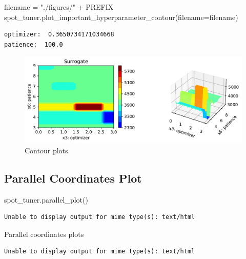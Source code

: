 \documentclass[
  letterpaper,
  DIV=11,
  numbers=noendperiod]{scrreprt}
\newenvironment{Shaded}{\begin{snugshade}}{\end{snugshade}}
\newcommand{\NormalTok}[1]{\textcolor[rgb]{0.00,0.23,0.31}{#1}}
\newcommand{\OperatorTok}[1]{\textcolor[rgb]{0.37,0.37,0.37}{#1}}
\newcommand{\StringTok}[1]{\textcolor[rgb]{0.13,0.47,0.30}{#1}}
\begin{document}
\begin{Shaded}
\begin{Highlighting}[]
\NormalTok{filename }\OperatorTok{=} \StringTok{"./figures/"} \OperatorTok{+}\NormalTok{ PREFIX}
\NormalTok{spot\_tuner.plot\_important\_hyperparameter\_contour(filename}\OperatorTok{=}\NormalTok{filename)}
\end{Highlighting}
\end{Shaded}

\begin{verbatim}
optimizer:  0.3650734171034668
patience:  100.0
\end{verbatim}

\begin{figure}[H]

{\centering \includegraphics{032_spot_lightning_rnn_diabetes_files/figure-pdf/cell-21-output-2.pdf}

}

\caption{Contour plots.}

\end{figure}%

\subsection{Parallel Coordinates
Plot}\label{parallel-coordinates-plot-1}

\begin{Shaded}
\begin{Highlighting}[]
\NormalTok{spot\_tuner.parallel\_plot()}
\end{Highlighting}
\end{Shaded}

\begin{verbatim}
Unable to display output for mime type(s): text/html
\end{verbatim}

Parallel coordinates plots

\begin{verbatim}
Unable to display output for mime type(s): text/html
\end{verbatim}
\end{document}
